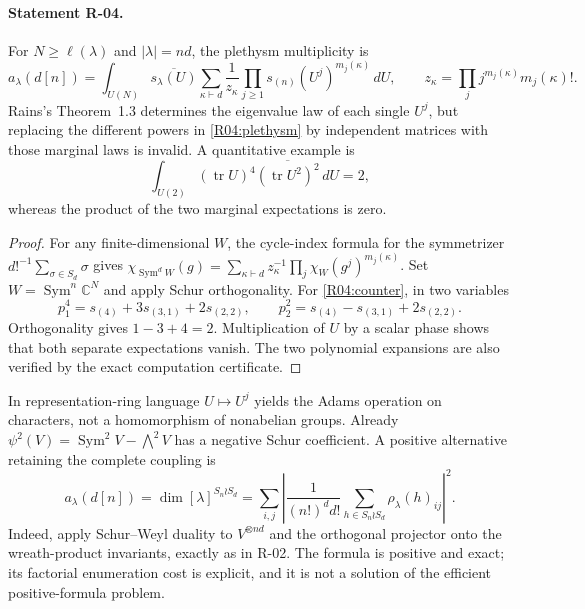 \paragraph{Statement R-04.}
For $N\geq\ell(\lambda)$ and $|\lambda|=nd$, the plethysm multiplicity is
\begin{equation}\label{R04:plethysm}
 a_\lambda(d[n])=\int_{U(N)}\overline{s_\lambda(U)}
 \sum_{\kappa\vdash d}\frac{1}{z_\kappa}
       \prod_{j\geq1}s_{(n)}(U^j)^{m_j(\kappa)}\,dU,
 \qquad z_\kappa=\prod_j j^{m_j(\kappa)}m_j(\kappa)!.
\end{equation}
Rains's Theorem~1.3 determines the eigenvalue law of each single $U^j$,
but replacing the different powers in \eqref{R04:plethysm} by independent
matrices with those marginal laws is invalid. A quantitative example is
\begin{equation}\label{R04:counter}
 \int_{U(2)}(\operatorname{tr}U)^4
        \overline{(\operatorname{tr}U^2)^2}\,dU=2,
\end{equation}
whereas the product of the two marginal expectations is zero.

\begin{proof}
For any finite-dimensional $W$, the cycle-index formula for the
symmetrizer $d!^{-1}\sum_{\sigma\in S_d}\sigma$ gives
$\chi_{\operatorname{Sym}^dW}(g)=\sum_{\kappa\vdash d}
z_\kappa^{-1}\prod_j\chi_W(g^j)^{m_j(\kappa)}$.
Set $W=\operatorname{Sym}^n\mathbb C^N$ and apply Schur orthogonality.
For \eqref{R04:counter}, in two variables
\[
 p_1^4=s_{(4)}+3s_{(3,1)}+2s_{(2,2)},\qquad
 p_2^2=s_{(4)}-s_{(3,1)}+2s_{(2,2)}.
\]
Orthogonality gives $1-3+4=2$. Multiplication of $U$ by a scalar phase
shows that both separate expectations vanish. The two polynomial
expansions are also verified by the exact computation certificate.
\end{proof}

In representation-ring language $U\mapsto U^j$ yields the Adams
operation on characters, not a homomorphism of nonabelian groups.
Already $\psi^2(V)=\operatorname{Sym}^2V-\bigwedge^2V$ has a negative
Schur coefficient. A positive alternative retaining the complete
coupling is
\begin{equation}\label{R04:wreath}
 a_\lambda(d[n])=\dim[\lambda]^{S_n\wr S_d}
 =\sum_{i,j}\left|\frac{1}{(n!)^d d!}
       \sum_{h\in S_n\wr S_d}\rho_\lambda(h)_{ij}\right|^2.
\end{equation}
Indeed, apply Schur--Weyl duality to $V^{\otimes nd}$ and the orthogonal
projector onto the wreath-product invariants, exactly as in R-02.
The formula is positive and exact; its factorial enumeration cost is
explicit, and it is not a solution of the efficient positive-formula
problem.

